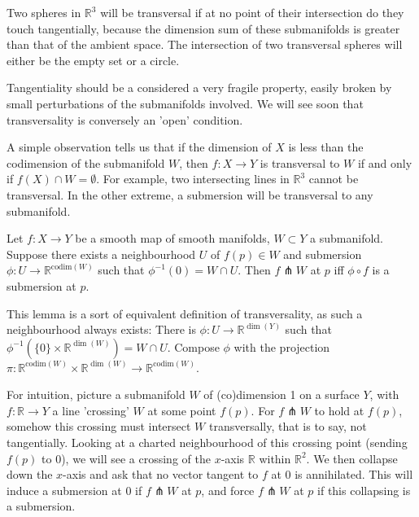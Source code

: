 \documentclass[12pt]{article}
\newcommand{\RR}{\mathbb{R}}
\begin{document}
\begin{example}
    Two spheres in $\RR^3$ will be transversal if at no point of their intersection do they touch tangentially, because the dimension sum of these submanifolds is greater than that of the ambient space. The intersection of two transversal spheres will either be the empty set or a circle.
\end{example}

Tangentiality should be a considered a very fragile property, easily broken by small perturbations of the submanifolds involved. We will see soon that transversality is conversely an 'open' condition.  \par
A simple observation tells us that if the dimension of $X$ is less than the codimension of the submanifold $W$, then $f: X \to Y$ is transversal to $W$ if and only if $f(X) \cap W = \emptyset$. For example, two intersecting lines in $\RR^3$ cannot be transversal. In the other extreme, a submersion will be transversal to any submanifold. 


\begin{lemma} \label{transversality equiv}
    Let $f: X \to Y$ be a smooth map of smooth manifolds, $W \subset Y$ a submanifold. Suppose there exists a neighbourhood $U$ of $f(p) \in W$ and submersion $\phi: U \to \RR^{\text{codim} (W)}$ such that $\phi^{-1}(0) = W \cap U$. Then $f\pitchfork W$ at $p$ iff $\phi \circ f$ is a submersion at $p$. 
\end{lemma}

This lemma is a sort of equivalent definition of transversality, as such a neighbourhood always exists: There is $\phi: U \to \RR^{\dim (Y)}$ such that $\phi^{-1}(\{ 0\} \times \RR^{\dim (W)}) = W \cap U$. Compose $\phi$ with the projection $\pi: \RR^{\text{codim}(W)} \times \RR^{\dim (W)} \to \RR^{\text{codim}(W)}$. \par
For intuition, picture a submanifold $W$ of (co)dimension 1 on a surface $Y$, with $f: \RR \to Y$ a line 'crossing' $W$ at some point $f(p)$. For $f \pitchfork W$ to hold at $f(p)$, somehow this crossing must intersect $W$ transversally, that is to say, not tangentially. Looking at a charted neighbourhood of this crossing point (sending $f(p)$ to $0$), we will see a crossing of the $x$-axis $\RR$ within $\RR^2$. We then collapse down the $x$-axis and ask that no vector tangent to $f$ at $0$ is annihilated. This will induce a submersion at $0$ if $f\pitchfork W$ at $p$, and force $f \pitchfork W$ at $p$ if this collapsing is a submersion. 
\end{document}
